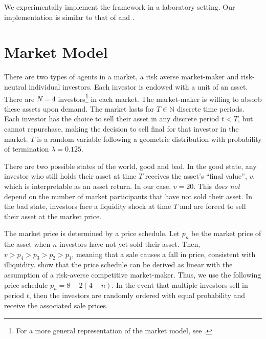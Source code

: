 \documentclass[thesis]{uathesis}
\begin{document}
\begin{body}
We experimentally implement the \cite{bernardo2004liquidity} framework in a laboratory setting. Our implementation is similar to that of \cite{magnani2020dynamic} and \cite{choi2022market}.

\section{Market Model} \label{sec:market model}
There are two types of agents in a market, a risk averse market-maker and risk-neutral individual investors. Each investor is endowed with a unit of an asset. There are $N=4$ investors\footnote{For a more general representation of the market model, see \cite{magnani2020dynamic}.} in each market. The market-maker is willing to absorb these assets upon demand. The market lasts for $T \in \mathbb{N}$ discrete time periods. Each investor has the choice to sell their asset in any discrete period $t < T$, but cannot repurchase, making the decision to sell final for that investor in the market. $T$ is a random variable following a geometric distribution with probability of termination $\lambda = 0.125$.

There are two possible states of the world, good and bad. In the good state, any investor who still holds their asset at time $T$ receives the asset's ``final value'', $v$, which is interpretable as an asset return. In our case, $v=20$. This \textit{does not} depend on the number of market participants that have not sold their asset. In the bad state, investors face a liquidity shock at time $T$ and are forced to sell their asset at the market price.

The market price is determined by a price schedule. Let $p_n$ be the market price of the asset when $n$ investors have not yet sold their asset. Then, $ v > p_4 > p_3 > p_2 > p_1$, meaning that a sale causes a fall in price, consistent with illiquidity. \cite{bernardo2004liquidity} show that the price schedule can be derived as linear with the assumption of a risk-averse competitive market-maker. Thus, we use the following price schedule $p_n = 8 - 2(4-n)$. In the event that multiple investors sell in period $t$, then the investors are randomly ordered with equal probability and receive the associated sale prices.


\end{body}
\end{document}
